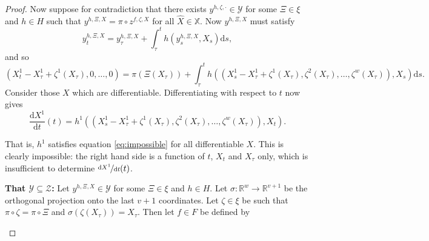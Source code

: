 \documentclass{article}
\theoremstyle{plain}
\theoremstyle{definition}
\newcommand{\reals}{\mathbb{R}}
\newcommand{\ttfrac}[2]{\nicefrac{#1}{#2}}
\newcommand{\boldheading}[1]{

\textbf{#1}\quad}
\begin{document}
\begin{proof}
	Now suppose for contradiction that there exists $y^{h, \zeta, \cdot} \in \mathcal{Y}$ for some $\Xi \in \xi$ and $h \in H$ such that $y^{h, \Xi, X} = \pi \circ z^{f, \zeta, X}$ for all $\widehat{X} \in \mathbb{X}$. Now $y^{h, \Xi, X}$ must satisfy
	\begin{equation*}
	y^{h, \Xi, X}_t = y^{h, \Xi, X}_\tau + \int_\tau^t h(y^{h, \Xi, X}_s, X_s) \mathrm{d}s,
	\end{equation*}
	and so
	\begin{equation*}
	(X^1_t - X^1_{\tau} + \zeta^1(X_\tau), 0, \ldots, 0) = \pi(\Xi(X_\tau)) + \int_{\tau}^t h((X^1_s - X^1_{\tau} + \zeta^1(X_\tau), \zeta^2(X_\tau), \ldots, \zeta^w(X_\tau)), X_s) \mathrm{d}s.
	\end{equation*}
	Consider those $X$ which are differentiable. Differentiating with respect to $t$ now gives
	\begin{equation}\label{eq:impossible}
	\frac{\mathrm{d}X^1}{\mathrm{d}t}(t) = h^1((X^1_s - X^1_{\tau} + \zeta^1(X_\tau), \zeta^2(X_\tau), \ldots, \zeta^w(X_\tau)), X_t).
	\end{equation}
	
	That is, $h^1$ satisfies equation \eqref{eq:impossible} for all differentiable $X$. This is clearly impossible: the right hand side is a function of $t$,  $X_t$ and $X_{\tau}$ only, which is insufficient to determine $\ttfrac{\mathrm{d}X^1}{\mathrm{d}t}(t)$.
	
	\boldheading{That $\mathcal{Y} \subseteq \mathcal{Z}$:}
	Let $y^{h, \Xi, X} \in \mathcal{Y}$ for some $\Xi \in \xi$ and $h \in H$. Let $\sigma \colon \reals^w \to \reals^{v + 1}$ be the orthogonal projection onto the last $v + 1$ coordinates. Let $\zeta \in \xi$ be such that $\pi \circ \zeta = \pi \circ \Xi$ and $\sigma(\zeta(X_\tau)) = X_\tau$. Then let $f \in F$ be defined by
	\begin{center}
\end{center}
\end{proof}
\end{document}
